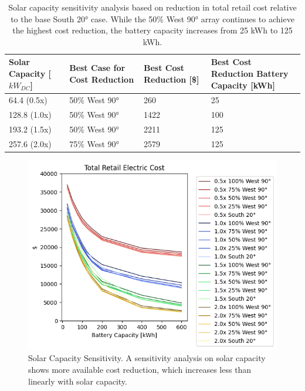 \documentclass[journal,article,submit,pdftex,moreauthors]{Definitions/mdpi}
\begin{document}
\begin{table}[!h]
  \caption{Solar capacity sensitivity analysis based on reduction in total retail cost relative to the base South 20° case. While the 50\% West 90° array continues to achieve the highest cost reduction, the battery capacity increases from 25 kWh to 125 kWh.}
  \label{tab:solar-sensitivity}
  \begin{tabularx}{\textwidth}{XXXX}
    \toprule
    Solar Capacity {[}\(kW_{DC}\){]} & Best Case for Cost Reduction         & Best
    Cost Reduction {[}\${]}          & Best Cost Reduction Battery Capacity
    {[}kWh{]}                                                                            \\
    \midrule
    64.4 (0.5x)                      & 50\% West 90°                        & 260  & 25  \\
    128.8 (1.0x)                     & 50\% West 90°                        & 1422 & 100 \\
    193.2 (1.5x)                     & 50\% West 90°                        & 2211 & 125 \\
    257.6 (2.0x)                     & 75\% West 90°                        & 2579 & 125 \\
    \bottomrule
  \end{tabularx}
\end{table}


\begin{figure}
  \centering
  \includegraphics[width=0.8\linewidth]{./images/total cost reduction solar sensitivity.png}
  \caption{Solar Capacity Sensitivity. A sensitivity analysis on solar capacity shows more available cost reduction, which increases less than linearly with solar capacity.}
  \label{fig:solar-sensitivity}
\end{figure}
\end{document}
